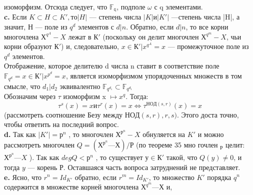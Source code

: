 изоморфизм. Отсюда следует, что $\mathbb{F_q}$, подполе $\omega$ с q элементами.\\
\hspace*{15pt}\textbf{c.} Если $K \subset H \subset K', то |H|$ --- степень числа $|K| и |K'|$ ---степень\linebreak
числа |H|, а значит, Н — поле из $q^{d}$ элементов с $d | n$. Обратно, если\linebreak
$d | n$, то все корни многочлена $Х^{q^{A}} - X$ лежат в $К'$ (поскольку он\linebreak
делит многочлен $Х^{q^{m}} - X$, чьи корни образуют $К'$) и, следовательно,\linebreak
${x \in К' | x^{q^{A}} = x}$ --- промежуточное поле из $q^d$ элементов.\\
\hspace*{0pt} Отображение, которое делителю d числа n ставит в соответствие
поле $\mathbb{F}_{q^{d}} = {x \in К' | x^{p^{d}}  = x}$, является изоморфизмом упорядоченных\linebreak
множеств в том смысле, что $d_1 | d_2$ эквивалентно $\mathbb{F}_{q^{d_1}} \subset \mathbb{F}_{q^{d_1}}$\\
\hspace*{15pt}Обозначим через $\tau$ изоморфизм x $\mapsto x^{q}$. Тогда:
$$\tau^{s}(x) = x и \tau^{r}(x) = x \Longleftrightarrow \tau^{НОД(s, r)}(x) = x$$
(рассмотреть соотношение Безу между $НОД(s,r), r, s)$. Этого доста­\linebreak
точно, чтобы ответить на последний вопрос.\\
\hspace*{15pt}\textbf{d.} Так как $|K'| = р^{n}$ , то многочлен $Х^{р^n} - X$ обнуляется на $K'$ и\linebreak
можно рассмотреть многочлен $Q = (Х^{р^{n}} — Х )/Р$ (по теореме 35 мно­\linebreak
гочлен $_Р$ целит: $Х^{р^{n}} — X$ ). Так как $degQ < р^{n}$ , то существует $у \in К'$\linebreak
такой, что $Q(y) \neq 0$, и тогда $y$ — корень $Р$. Оставшаяся часть вопроса \linebreak
затруднений не представляет.\\
\hspace*{15pt}\textbf{e.} Ясно, что $r^{n} = Id_{K'}$ обратно, если $r^{m} = Id_{K'}$, то множество\linebreak
$K'$ порядка $q^{n}$ содержится в множестве корней многочлена $Х^{q^{m}} — Х$ и,\linebreak

